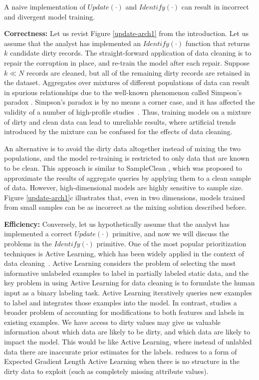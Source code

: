 A naive implementation of $Update(\cdot)$ and $Identify(\cdot)$ can result in incorrect and divergent model training.

\vspace{0.5em}
\noindent \textbf{Correctness: } Let us revist Figure \ref{update-arch1} from the introduction. Let us assume that the analyst has implemented an $Identify(\cdot)$ function that returns $k$ candidate dirty records.
The straight-forward application of data cleaning is to repair the corruption in place, and re-train the model after each repair.
Suppose $k \ll N$ records are cleaned, but all of the remaining dirty records are retained in the dataset.
Aggregates over mixtures of different populations of data can result in spurious relationships due to the well-known phenomenon called Simpson's paradox \cite{simpson1951interpretation}.
Simpson's paradox is by no means a corner case, and it has affected the validity of a number of high-profile studies~\cite{simpsonsparadox}.
Thus, training models on a mixture of dirty and clean data can lead to unreliable results, where artificial trends introduced by the mixture can be confused for the effects of data cleaning.

An alternative is to avoid the dirty data altogether instead of mixing the two populations, and the model re-training is restricted to only data that are known to be clean.
This approach is similar to SampleClean \cite{wang1999sample}, which was proposed to approximate the results of aggregate queries by applying them to a clean sample of data.
However, high-dimensional models are highly sensitive to sample size.
Figure \ref{update-arch1}c illustrates that, even in two dimensions, models trained from small samples can be as incorrect as the mixing solution described before.

\vspace{0.5em} 

\noindent \textbf{Efficiency: } Conversely, let us hypothetically assume that the analyst has implemented a correct $Update(\cdot)$ primitive, and now we will discuss the problems in the $Identify(\cdot)$ primitive.
One of the most popular prioritization techniques is Active Learning, which has been widely applied in the context of data cleaning~\cite{DBLP:journals/pvldb/YakoutENOI11,gokhale2014corleone}.
Active Learning considers the problem of selecting the most informative unlabeled examples to label in partially labeled static data, and the key problem in using Active Learning for data cleaning is to formulate the human input as a binary labeling task.
Active Learning iteratively queries new examples to label and integrates those examples into the model.
In contrast, \sys studies a broader problem of accounting for modifications to both features and labels in existing examples.
We have access to dirty values may give us valuable information about which data are likely to be dirty, and which data are likely to impact the model. 
This would be like Active Learning, where instead of unlabled data there are inaccurate prior estimates for the labels.
\sys reduces to a form of Expected Gradient Length Active Learning when there is no structure in the dirty data to exploit (such as completely missing attribute values).




